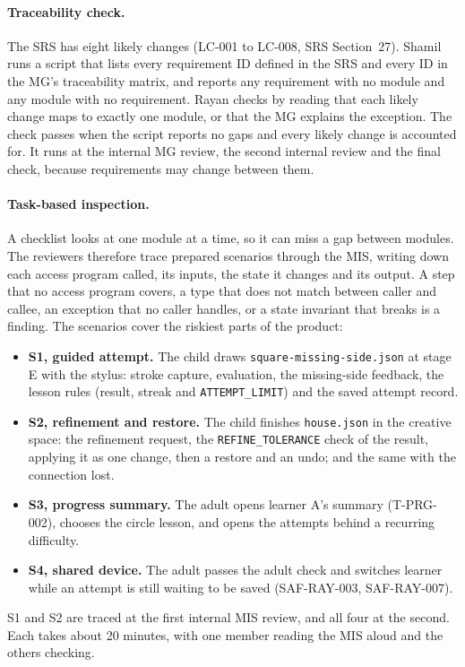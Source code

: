 \documentclass[12pt, titlepage]{article}
\begin{document}
\paragraph{Traceability check.} The SRS has eight likely changes (LC-001 to
LC-008, SRS Section~27). Shamil runs a script that lists
every requirement ID defined in the SRS and every ID in the MG's traceability
matrix, and reports any requirement with no module and any module with no
requirement. Rayan checks by reading that each likely change maps to exactly
one module, or that the MG explains the exception. The check passes when the
script reports no gaps and every likely change is accounted for. It runs at
the internal MG review, the second internal review and the final check, because
requirements may change between them.

\paragraph{Task-based inspection.} A checklist looks at one module at a time,
so it can miss a gap between modules. The reviewers therefore trace prepared
scenarios through the MIS, writing down each access program called, its
inputs, the state it changes and its output. A step that no access program
covers, a type that does not match between caller and callee, an exception
that no caller handles, or a state invariant that breaks is a finding. The
scenarios cover the riskiest parts of the product:
\begin{itemize}
\item \textbf{S1, guided attempt.} The child draws
\texttt{square-\allowbreak{}missing-\allowbreak{}side.json} at stage E with
the stylus: stroke capture, evaluation, the missing-side feedback, the lesson
rules (result, streak and \texttt{ATTEMPT\_LIMIT}) and the saved attempt
record.
\item \textbf{S2, refinement and restore.} The child finishes
\texttt{house.json} in the creative space: the refinement request, the
\texttt{REFINE\_TOLERANCE} check of the result, applying it as one change,
then a restore and an undo; and the same with the connection lost.
\item \textbf{S3, progress summary.} The adult opens learner A's summary
(T-PRG-002), chooses the circle lesson, and opens the attempts behind a
recurring difficulty.
\item \textbf{S4, shared device.} The adult passes the adult check and
switches learner while an attempt is still waiting to be saved
(SAF-RAY-003, SAF-RAY-007).
\end{itemize}
S1 and S2 are traced at the first internal MIS review, and all four at the
second. Each takes about 20 minutes, with one member reading the MIS aloud
and the others checking.
\end{document}
